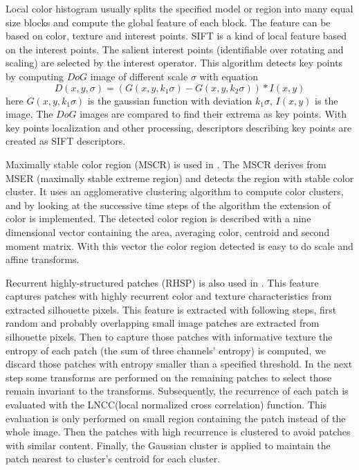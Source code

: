 Local color histogram usually splits the specified model or region into many equal size blocks and compute the global feature of each block. The feature can be based on color, texture and interest points. SIFT \cite{SIFT} is a kind of local feature based on the interest points. The salient interest points (identifiable over rotating and scaling) are selected by the interest operator. This algorithm detects key points by computing $DoG$ image of different scale $\sigma$ with equation
\begin{equation}
D(x,y,\sigma) = (G(x,y,k_1\sigma) - G(x,y,k_2\sigma))\ast I(x,y)
\end{equation}
here $G(x,y,k_1\sigma)$ is the gaussian function with deviation $k_1\sigma$, $I(x,y)$ is the image. The $DoG$ images are compared to find their extrema as key points. With key points localization and other processing, descriptors describing key points are created as SIFT descriptors.

Maximally stable color region (MSCR) is used in \cite{SDALF}. The MSCR derives from MSER (maximally stable extreme region) and detects the region with stable color cluster. It uses an agglomerative clustering algorithm to compute color clusters, and by looking at the successive time steps of the algorithm the extension of color is implemented. The detected color region is described with a nine dimensional vector containing the area, averaging color, centroid and second moment matrix. With this vector the color region detected is easy to do scale and affine transforms.

Recurrent highly-structured patches (RHSP) is also used in \cite{SDALF}. This feature captures patches with highly recurrent color and texture characteristics from extracted silhouette pixels. This feature is extracted with following steps, first random and probably overlapping small image patches are extracted from silhouette pixels. Then to capture those patches with informative texture the entropy of each patch (the sum of three channels' entropy) is computed, we discard those patches with entropy smaller than a specified threshold. In the next step some transforms are performed on the remaining patches to select those remain invariant to the transforms. Subsequently, the recurrence of each patch is evaluated with the LNCC(local normalized cross correlation) function. This evaluation is only performed on small region containing the patch instead of the whole image. Then the patches with high recurrence is clustered to avoid patches with similar content. Finally, the Gaussian cluster is applied to maintain the patch nearest to cluster's centroid for each cluster.
 
